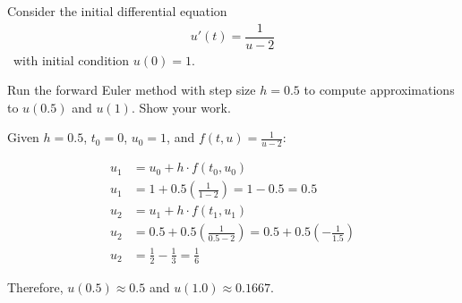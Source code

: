 \documentclass[reqno, answers]{exam}
\begin{document}
\begin{questions}
\begin{solution}
  \end{solution}

  \newpage
  \question[10]
  Consider the initial differential equation
  \begin{align*}
    u'(t) = \dfrac{1}{u - 2}
  \end{align*}\
  with initial condition $u(0) = 1$.

  Run the forward Euler method with step size $h = 0.5$ to compute approximations to $u(0.5)$ and $u(1)$. Show your work.

  \begin{solution}

    Given $h = 0.5$, $t_0 = 0$, $u_0 = 1$, and $f(t, u) = \frac{1}{u-2}$:

    \begin{align*}
      u_1 & = u_0 + h \cdot f(t_0, u_0)                                                          \\
      u_1 & = 1 + 0.5 \left( \frac{1}{1-2} \right) = 1 - 0.5 = 0.5                               \\
      u_2 & = u_1 + h \cdot f(t_1, u_1)                                                          \\
      u_2 & = 0.5 + 0.5 \left( \frac{1}{0.5-2} \right) = 0.5 + 0.5 \left( -\frac{1}{1.5} \right) \\
      u_2 & = \frac{1}{2} - \frac{1}{3} = \frac{1}{6}
    \end{align*}

    Therefore, $u(0.5) \approx 0.5$ and $u(1.0) \approx 0.1667$.
  \end{solution}


\end{questions}
\end{document}
